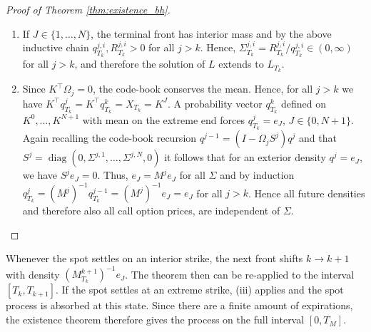 \documentclass[11pt]{article}
\DeclareMathOperator{\diag}{diag}
\theoremstyle{plain}
\theoremstyle{definition}
\theoremstyle{remark}
\begin{document}
\begin{proof}[Proof of Theorem \ref{thm:existence_bh}]
\begin{enumerate}[label=(\roman*)]
  Now, suppose that $\zeta < T_k$. Then the Brownian motion $B_\zeta$ is finite, and the front density $q^k_\zeta$ has still strictly positive interior entries. Applying the above inductive chain for $j = k+1, \dots, M$ we obtain that $\Sigma^{j, i}_{\zeta-} = R^{j, i}_{\zeta-} / q_{\zeta-}^{j, i} \in (0, \infty)$. Hence, $L$ has a finite limit at $\zeta$ which means it could be extended to $\zeta$, contradicting the maximality of $\zeta$. Therefore $\zeta = T_k$ demonstrating existence. 
  

  \item If $J \in \lbrace 1, \dots, N \rbrace $, the terminal front has interior mass and by the above inductive chain $q^{j,i}_{T_k},R^{j,i}_{T_k}>0$ for all $j > k$. Hence, $\Sigma^{j, i}_{T_k} = R^{j, i}_{T_k} / q^{j, i}_{T_k} \in (0, \infty)$ for all $j > k$, and therefore the solution of $L$ extends to $L_{T_k}$. 
  
  \item Since $K^\top \Omega_j = 0$, the code-book conserves the mean. Hence, for all $j > k$ we have $K^\top q^j_{T_k} = K^\top q^k_{T_k} = X_{T_k} = K^J$. A probability vector $q^{k}_{T_k}$ defined on $K^0, \dots, K^{N+1}$ with mean on the extreme end forces $q^j_{T_k} = e_J$, $J \in \lbrace 0, N+1 \rbrace$. Again recalling the code-book recursion $q^{j-1} = (I - \Omega_j S^j) q^j$ and that $S^j = \diag(0, \Sigma^{j, 1}, \dots, \Sigma^{j, N}, 0)$ it follows that for an exterior density $q^j = e_J$, we have $S^j e_J = 0$. Thus, $e_J = M^j e_J$ for all $\Sigma$ and by induction $ q^{j}_{T_k} = (M^j)^{-1} q^{j-1}_{T_k} = (M^j)^{-1} e_J = e_J$ for all $j > k$. Hence all future densities and therefore also all call option prices, are independent of $\Sigma$. 
\end{enumerate}
\end{proof}

Whenever the spot settles on an interior strike, the next front shifts $k \rightarrow k +1 $ with density $(M^{k+1}_{T_k})^{-1}e_J$. The theorem then can be re-applied to the interval $[T_k, T_{k+1}]$. If the spot settles at an extreme strike, (iii) applies and the spot process is absorbed at this state. Since there are a finite amount of expirations, the existence theorem therefore gives the process on the full interval $[0, T_M]$. 
\end{document}

